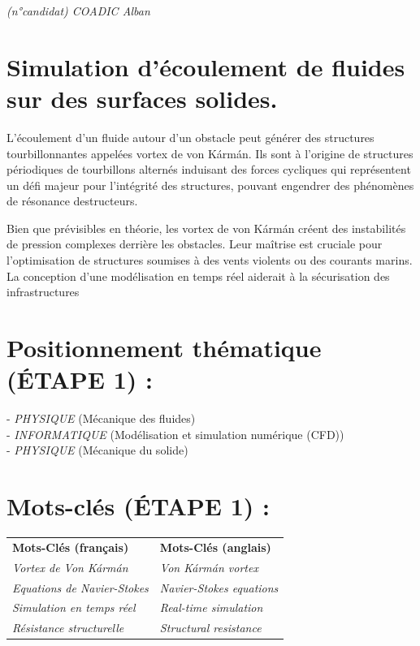 \documentclass{article}
\begin{document}
\textit{(n°candidat) COADIC Alban}

\section*{Simulation d'écoulement de fluides sur des surfaces solides.}
\vspace{5mm}


L'écoulement d'un fluide autour d'un obstacle peut générer des structures
tourbillonnantes appelées vortex de von Kármán. Ils sont à l'origine de structures
périodiques de tourbillons alternés induisant des forces cycliques qui représentent un
défi majeur pour l'intégrité des structures, pouvant engendrer des phénomènes de
résonance destructeurs.

\vspace{8mm}

Bien que prévisibles en théorie, les vortex de von Kármán créent des instabilités de
pression complexes derrière les obstacles. Leur maîtrise est cruciale pour l'optimisation
de structures soumises à des vents violents ou des courants marins. La conception d'une
modélisation en temps réel aiderait à la sécurisation des infrastructures



\section*{Positionnement thématique (ÉTAPE 1) :}
- \textit{PHYSIQUE} (Mécanique des fluides)\\
- \textit{INFORMATIQUE} (Modélisation et simulation numérique (CFD))\\
- \textit{PHYSIQUE} (Mécanique du solide)\\


\section*{Mots-clés (ÉTAPE 1) :}
\begin{tabular}{ll}
\textbf{Mots-Clés (français)} & \textbf{Mots-Clés (anglais)} \\
\textit{Vortex de Von Kármán} & \textit{Von Kármán vortex} \\
\textit{Equations de Navier-Stokes} & \textit{Navier-Stokes equations} \\
\textit{Simulation en temps réel} & \textit{Real-time simulation} \\
\textit{Résistance structurelle} & \textit{Structural resistance} 
\end{tabular}
\vspace{5mm}  
\end{document}
